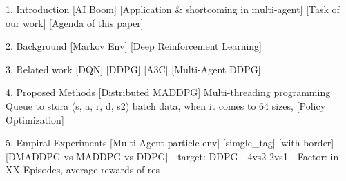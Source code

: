 1. Introduction
[AI Boom]
[Application & shortcoming in multi-agent]
[Task of our work]
[Agenda of this paper]

2. Background
[Markov Env]
[Deep Reinforcement Learning]

3. Related work
[DQN]
[DDPG]
[A3C]
[Multi-Agent DDPG]

4. Proposed Methods
[Distributed MADDPG]
Multi-threading programming
Queue to stora (s, a, r, d, s2) batch data, when it comes to 64 sizes,
[Policy Optimization]

5. Empiral Experiments
[Multi-Agent particle env] [simgle_tag] [with border]
[DMADDPG vs MADDPG vs DDPG] 
- target: DDPG
- 4vs2 2vs1
- Factor: in XX Episodes, average rewards of res
